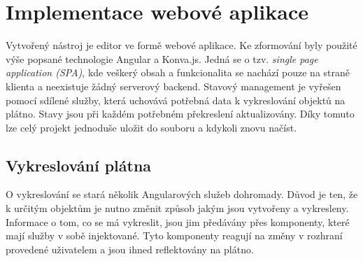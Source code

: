 \chapter{Implementace webové aplikace}
\label{chap:implementation}

Vytvořený nástroj je editor ve formě webové aplikace. Ke zformování byly použité výše popsané technologie Angular a Konva.js. 
Jedná se o tzv. \emph{single page application (SPA)}, kde veškerý obsah a funkcionalita se nachází pouze na straně klienta a neexistuje žádný
serverový backend. Stavový management je vyřešen pomocí sdílené služby, která uchovává potřebná data k vykreslování objektů na plátno.
Stavy jsou při každém potřebném překreslení aktualizovány. Díky tomuto lze celý projekt jednoduše uložit do souboru a kdykoli znovu načíst.
    
\section{Vykreslování plátna}
    O vykreslování se stará několik Angularových služeb dohromady. Důvod je ten, že k určitým objektům je nutno změnit způsob jakým jsou vytvořeny a vykresleny.
    Informace o tom, co se má vykreslit, jsou jim předávány přes komponenty, které mají služby v sobě injektované. Tyto komponenty reagují
    na změny v rozhraní provedené uživatelem a jsou ihned reflektovány na plátno.


